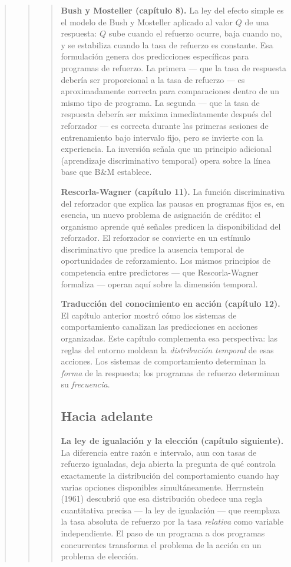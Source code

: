 \documentclass[
  letterpaper,
  DIV=11,
  numbers=noendperiod]{scrreprt}
\begin{document}
\begin{tcolorbox}[enhanced jigsaw, toprule=.15mm, arc=.35mm, colback=white, opacityback=0, colframe=quarto-callout-note-color-frame, breakable, rightrule=.15mm, left=2mm, leftrule=.75mm, bottomrule=.15mm]
\begin{quote}
\begin{quote}
\begin{quote}
\textbf{Bush y Mosteller (capítulo 8).} La ley del efecto simple es el
modelo de Bush y Mosteller aplicado al valor \(Q\) de una respuesta:
\(Q\) sube cuando el refuerzo ocurre, baja cuando no, y se estabiliza
cuando la tasa de refuerzo es constante. Esa formulación genera dos
predicciones específicas para programas de refuerzo. La primera --- que
la tasa de respuesta debería ser proporcional a la tasa de refuerzo ---
es aproximadamente correcta para comparaciones dentro de un mismo tipo
de programa. La segunda --- que la tasa de respuesta debería ser máxima
inmediatamente después del reforzador --- es correcta durante las
primeras sesiones de entrenamiento bajo intervalo fijo, pero se invierte
con la experiencia. La inversión señala que un principio adicional
(aprendizaje discriminativo temporal) opera sobre la línea base que B\&M
establece.

\textbf{Rescorla-Wagner (capítulo 11).} La función discriminativa del
reforzador que explica las pausas en programas fijos es, en esencia, un
nuevo problema de asignación de crédito: el organismo aprende qué
señales predicen la disponibilidad del reforzador. El reforzador se
convierte en un estímulo discriminativo que predice la ausencia temporal
de oportunidades de reforzamiento. Los mismos principios de competencia
entre predictores --- que Rescorla-Wagner formaliza --- operan aquí
sobre la dimensión temporal.

\textbf{Traducción del conocimiento en acción (capítulo 12).} El
capítulo anterior mostró cómo los sistemas de comportamiento canalizan
las predicciones en acciones organizadas. Este capítulo complementa esa
perspectiva: las reglas del entorno moldean la \emph{distribución
temporal} de esas acciones. Los sistemas de comportamiento determinan la
\emph{forma} de la respuesta; los programas de refuerzo determinan su
\emph{frecuencia}.

\subsection{Hacia adelante}\label{hacia-adelante-1}

\textbf{La ley de igualación y la elección (capítulo siguiente).} La
diferencia entre razón e intervalo, aun con tasas de refuerzo igualadas,
deja abierta la pregunta de qué controla exactamente la distribución del
comportamiento cuando hay varias opciones disponibles simultáneamente.
Herrnstein (1961) descubrió que esa distribución obedece una regla
cuantitativa precisa --- la ley de igualación --- que reemplaza la tasa
absoluta de refuerzo por la tasa \emph{relativa} como variable
independiente. El paso de un programa a dos programas concurrentes
transforma el problema de la acción en un problema de elección.


\end{quote}
\end{quote}
\end{quote}
\end{tcolorbox}
\end{document}
